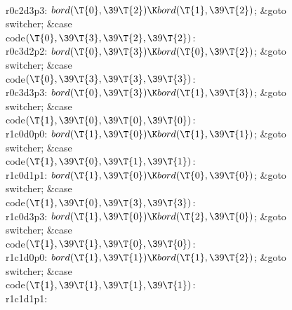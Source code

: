 \\{r0c2d3p3}:\5
${}\\{bord}(\T{0},\39\T{2})\K\\{bord}(\T{1},\39\T{2}){}$;\5
\&{goto} \\{switcher};\6
\4\&{case} \\{code}${}(\T{0},\39\T{3},\39\T{2},\39\T{2}){}$:\5
\\{r0c3d2p2}:\5
${}\\{bord}(\T{0},\39\T{3})\K\\{bord}(\T{0},\39\T{2}){}$;\5
\&{goto} \\{switcher};\6
\4\&{case} \\{code}${}(\T{0},\39\T{3},\39\T{3},\39\T{3}){}$:\5
\\{r0c3d3p3}:\5
${}\\{bord}(\T{0},\39\T{3})\K\\{bord}(\T{1},\39\T{3}){}$;\5
\&{goto} \\{switcher};\6
\4\&{case} \\{code}${}(\T{1},\39\T{0},\39\T{0},\39\T{0}){}$:\5
\\{r1c0d0p0}:\5
${}\\{bord}(\T{1},\39\T{0})\K\\{bord}(\T{1},\39\T{1}){}$;\5
\&{goto} \\{switcher};\6
\4\&{case} \\{code}${}(\T{1},\39\T{0},\39\T{1},\39\T{1}){}$:\5
\\{r1c0d1p1}:\5
${}\\{bord}(\T{1},\39\T{0})\K\\{bord}(\T{0},\39\T{0}){}$;\5
\&{goto} \\{switcher};\6
\4\&{case} \\{code}${}(\T{1},\39\T{0},\39\T{3},\39\T{3}){}$:\5
\\{r1c0d3p3}:\5
${}\\{bord}(\T{1},\39\T{0})\K\\{bord}(\T{2},\39\T{0}){}$;\5
\&{goto} \\{switcher};\6
\4\&{case} \\{code}${}(\T{1},\39\T{1},\39\T{0},\39\T{0}){}$:\5
\\{r1c1d0p0}:\5
${}\\{bord}(\T{1},\39\T{1})\K\\{bord}(\T{1},\39\T{2}){}$;\5
\&{goto} \\{switcher};\6
\4\&{case} \\{code}${}(\T{1},\39\T{1},\39\T{1},\39\T{1}){}$:\5
\\{r1c1d1p1}:\5

